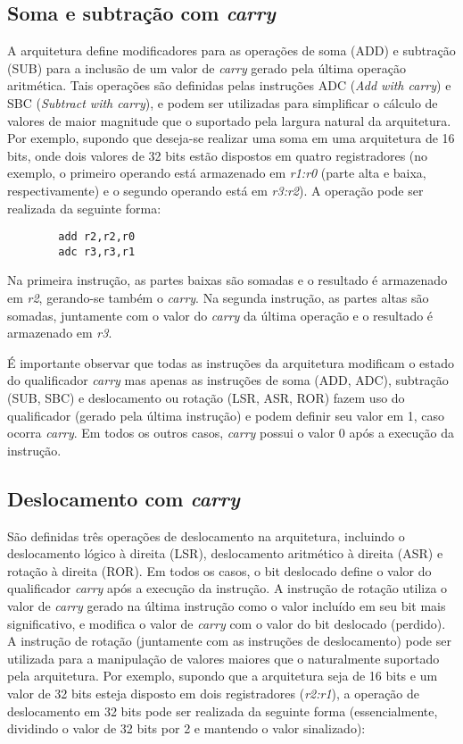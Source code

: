 \documentclass{extreport}
\begin{document}
\subsection{Soma e subtração com \textit{carry}}
A arquitetura define modificadores para as operações de soma (ADD) e subtração (SUB) para a inclusão de um valor de \textit{carry} gerado pela última operação aritmética. Tais operações são definidas pelas instruções ADC (\textit{Add with carry}) e SBC (\textit{Subtract with carry}), e podem ser utilizadas para simplificar o cálculo de valores de maior magnitude que o suportado pela largura natural da arquitetura. Por exemplo, supondo que deseja-se realizar uma soma em uma arquitetura de 16 bits, onde dois valores de 32 bits estão dispostos em quatro registradores (no exemplo, o primeiro operando está armazenado em \textit{r1:r0} (parte alta e baixa, respectivamente) e o segundo operando está em \textit{r3:r2}). A operação pode ser realizada da seguinte forma:

\begin{verbatim}
        add r2,r2,r0
        adc r3,r3,r1
\end{verbatim}

Na primeira instrução, as partes baixas são somadas e o resultado é armazenado em \textit{r2}, gerando-se também o \textit{carry}. Na segunda instrução, as partes altas são somadas, juntamente com o valor do \textit{carry} da última operação e o resultado é armazenado em \textit{r3}.

É importante observar que todas as instruções da arquitetura modificam o estado do qualificador \textit{carry} mas apenas as instruções de soma (ADD, ADC), subtração (SUB, SBC) e deslocamento ou rotação (LSR, ASR, ROR) fazem uso do qualificador (gerado pela última instrução) e podem definir seu valor em 1, caso ocorra \textit{carry}. Em todos os outros casos, \textit{carry} possui o valor 0 após a execução da instrução.

\subsection{Deslocamento com \textit{carry}}

São definidas três operações de deslocamento na arquitetura, incluindo o deslocamento lógico à direita (LSR), deslocamento aritmético à direita (ASR) e rotação à direita (ROR). Em todos os casos, o bit deslocado define o valor do qualificador \textit{carry} após a execução da instrução. A instrução de rotação utiliza o valor de \textit{carry} gerado na última instrução como o valor incluído em seu bit mais significativo, e modifica o valor de \textit{carry} com o valor do bit deslocado (perdido). A instrução de rotação (juntamente com as instruções de deslocamento) pode ser utilizada para a manipulação de valores maiores que o naturalmente suportado pela arquitetura. Por exemplo, supondo que a arquitetura seja de 16 bits e um valor de 32 bits esteja disposto em dois registradores (\textit{r2:r1}), a operação de deslocamento em 32 bits pode ser realizada da seguinte forma (essencialmente, dividindo o valor de 32 bits por 2 e mantendo o valor sinalizado):
\end{document}
